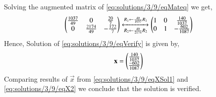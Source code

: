 Solving the augmented matrix of \eqref{eq:solutions/3/9/eqMateq} we get,
\begin{align}
	\begin{pmatrix}\frac{1037}{49} & 0 & \frac{20}{7} \\ 0 & \frac{2174}{49} & -\frac{172}{7}\end{pmatrix} 
	\xleftrightarrow[R_2 \leftarrow \frac{49}{2174}R_2]{R_1 \leftarrow \frac{49}{1037}R_1}
	\begin{pmatrix}1 & 0 & \frac{140}{1037} \\ 0 & 1 & -\frac{602}{1087}\end{pmatrix}
\end{align}
Hence, Solution of \eqref{eq:solutions/3/9/eqVerify} is given by,
\begin{align}
	\mathbf{x}=\begin{pmatrix}\frac{140}{1037} \\ \frac{-602}{1087}\end{pmatrix}\label{eq:solutions/3/9/eqX2}
\end{align}
Comparing results of $\vec{x}$ from \eqref{eq:solutions/3/9/eqXSol1} and \eqref{eq:solutions/3/9/eqX2} we conclude that the solution is verified.
